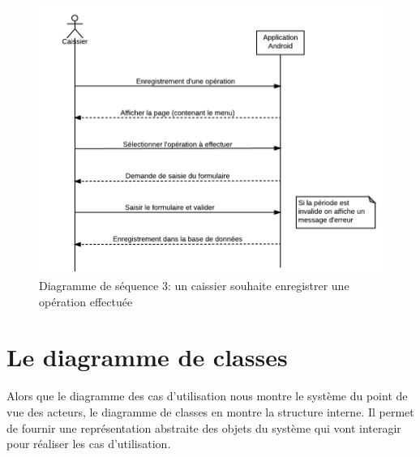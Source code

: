 \documentclass[12pt]{report}
\begin{document}
	  \begin{figure}[H]
		\begin{center}
		  \includegraphics[scale=0.7]{images/diagramSequence3.png}
		  \caption{Diagramme de séquence 3: un caissier souhaite enregistrer une opération effectuée}
		\end{center}
	  \end{figure}
	  
      \section{Le diagramme de classes}
      Alors que le diagramme des cas d'utilisation nous montre le système du point de vue des acteurs, le diagramme de classes en montre la structure interne. Il permet de fournir une représentation abstraite des objets du système qui vont interagir pour réaliser les cas d'utilisation.
      
\end{document}
